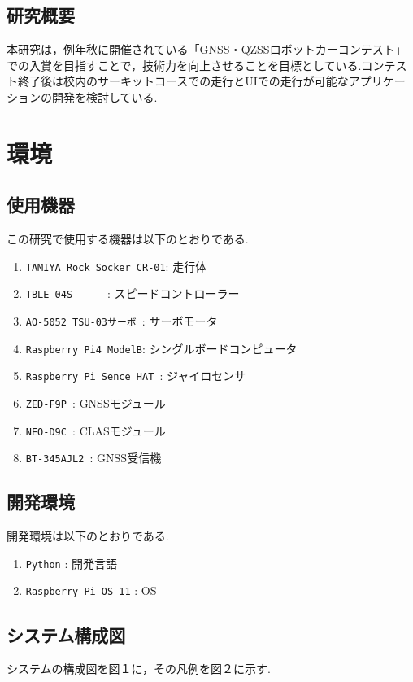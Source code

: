 \documentclass[submit,techrep,noauthor]{ipsj}
\def\|{\verb|}
\begin{document}
%1.2
\subsection{研究概要}
本研究は，例年秋に開催されている「GNSS・QZSSロボットカーコンテスト」での入賞を目指すことで，技術力を向上させることを目標としている.コンテスト終了後は校内のサーキットコースでの走行とUIでの走行が可能なアプリケーションの開発を検討している.




%2
\section{環境}


%2.1
\subsection{使用機器}
この研究で使用する機器は以下のとおりである.

\begin{enumerate}
\item \|TAMIYA Rock Socker CR-01|: 走行体
\item \|TBLE-04S      |: スピードコントローラー
\item \|AO-5052 TSU-03サーボ |: サーボモータ
\item \|Raspberry Pi4 ModelB|: シングルボードコンピュータ
\item \|Raspberry Pi Sence HAT |: ジャイロセンサ
\item \|ZED-F9P |: GNSSモジュール
\item \|NEO-D9C |: CLASモジュール
\item \|BT-345AJL2 |: GNSS受信機
\end{enumerate}


\subsection{開発環境}
開発環境は以下のとおりである.
\begin{enumerate}
\item \|Python| : 開発言語 
\item \|Raspberry Pi OS 11| : OS　%
\end{enumerate}


\subsection{システム構成図}
システムの構成図を図１に，その凡例を図２に示す.
\end{document}
